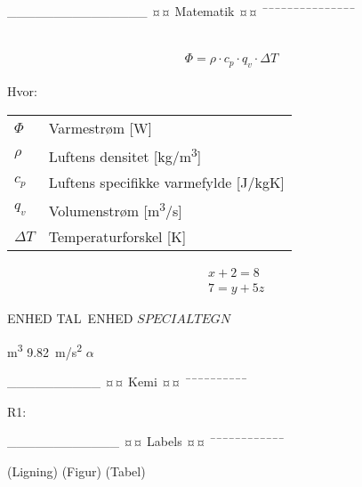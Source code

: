

_______________
¤¤ Matematik ¤¤
¯¯¯¯¯¯¯¯¯¯¯¯¯¯¯

\begin{align}
		
	\label{eq:LABEL} %
\end{align}

\begin{align}
	\Phi = \rho \cdot c_p \cdot q_v \cdot \Delta T
	\label{eq:varmeflux}
\end{align}

Hvor:
\begin{table}[H]
	\begin{tabular}{l|l}
	$\Phi$     & Varmestrøm [\si{W}] \\
	$\rho$ 	   & Luftens densitet [\si{kg/m^3}] \\
	$c_p$ 	   & Luftens specifikke varmefylde [\si{J/kgK}] \\
	$q_v$	   & Volumenstrøm [\si{m^3/s}] \\
	$\Delta T$ & Temperaturforskel [\si{K}]
	\end{tabular}
\end{table}

\begin{align}
& x + 2 = 8 	\label{eq:lign1} \\ 	%
& 7 = y + 5 z 	\label{eq:lign2}
\end{align}

\si{ENHED}
\SI{TAL}{ENHED}
$SPECIALTEGN$

\si{m^3}
\SI{9,82}{m/s^2}
$\alpha$

__________
¤¤ Kemi ¤¤
¯¯¯¯¯¯¯¯¯¯




R1: 

____________
¤¤ Labels ¤¤
¯¯¯¯¯¯¯¯¯¯¯¯

\label{eq:...} 		(Ligning)
\label{fig:...} 	(Figur)
\label{tab:...} 	(Tabel)

